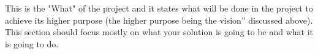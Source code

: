 This is the "What" of the project and it states what will be done in the project to achieve its higher purpose (the higher purpose being the vision” discussed above). This section should focus mostly on what your solution is going to be and what it is going to do.